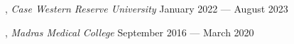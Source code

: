 


, \textit{Case Western Reserve University}	\hfill January 2022 --- August 2023

, \textit{Madras Medical College} \hfill	September 2016 --- March 2020


